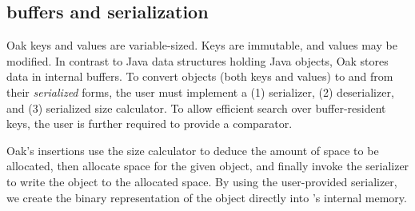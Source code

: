 \subsection{\oak\/ buffers and serialization}
\label{ssec:managed-API}


Oak keys and values are variable-sized. Keys are immutable, and values may be modified. 
In contrast to Java data structures holding Java objects, Oak stores data in internal buffers. 
To convert objects (both keys and values) to and from their \emph{serialized} forms, the user must implement 
a (1) serializer, (2) deserializer, and (3) serialized size calculator. %
To allow efficient search over buffer-resident keys, the user is further required to provide 
a {comparator}.

Oak's insertions use the size calculator to deduce the amount of space to be allocated, then allocate space for the given object, 
and finally invoke the serializer to write the object to the allocated space. 
By using the user-provided serializer, we create the binary representation of the object directly into \oak's internal memory.  






